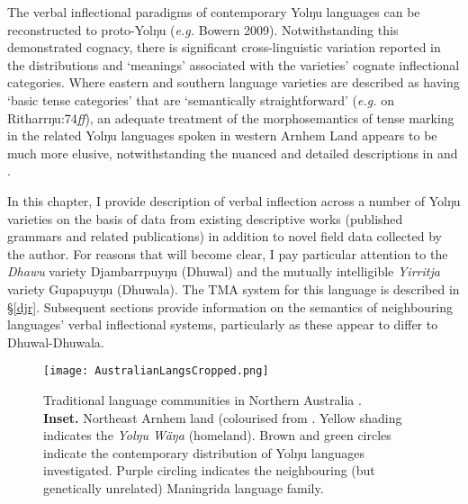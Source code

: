 
The verbal inflectional paradigms of contemporary Yolŋu languages can be reconstructed to proto-Yolŋu (\textit{e.g.} Bowern 2009). Notwithstanding this demonstrated cognacy, there is significant cross-linguistic variation reported in the distributions and `meanings' associated with the varieties' cognate inflectional categories. Where eastern and southern language varieties are described as having `basic tense categories' that are `semantically straightforward' (\textit{e.g.} \citealt{Heath1980} on Ritharrŋu:74\textit{ff}), an adequate treatment of the morphosemantics of tense marking in the related Yolŋu languages spoken in western Arnhem Land appears to be much more elusive, notwithstanding the nuanced and detailed descriptions in \citealt{Wilkinson1991} and \citealt{McLellan1992}.


 In this chapter, I provide description of verbal inflection across a number of Yolŋu varieties on the basis of data from existing descriptive works (published grammars and related publications) in addition to novel field data collected by the author. For reasons that will become clear, I pay particular attention to the \textit{Dhawu} variety Djambarrpuyŋu (Dhuwal) and the mutually intelligible \textit{Yirritja} variety Gupapuyŋu (Dhuwala). The TMA system for this language is described in §\ref{djr}. Subsequent sections provide information on the semantics of neighbouring languages' verbal inflectional systems, particularly as these appear to differ to Dhuwal-Dhuwala.


\begin{figure}[h]
	\centering\caption{Traditional language communities in Northern Australia \citep{Horton1996}.\\\textbf{Inset. }Northeast Arnhem land (colourised from \citealt[2]{Wilkinson1991}. Yellow shading indicates the \textit{Yolŋu Wäŋa} (homeland). Brown and green circles indicate the contemporary distribution of Yolŋu languages investigated. Purple circling indicates the neighbouring (but genetically unrelated) Maningrida language family.}	\texttt{[image: AustralianLangsCropped.png]}\label{map}
\end{figure}




